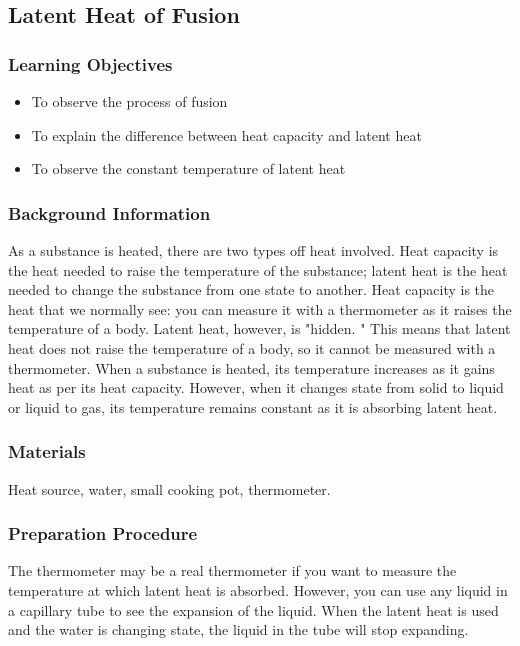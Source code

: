 \subsection{Latent Heat of Fusion} %

\subsubsection*{Learning Objectives}
\begin{itemize}
\item{To observe the process of fusion} 
\item{To explain the difference between heat capacity and latent heat} 
\item{To observe the constant temperature of latent heat} 
\end{itemize}

\subsubsection*{Background Information}
As a substance is heated, there are two types off heat involved. Heat capacity is the heat needed to raise the temperature of the substance; latent heat is the heat needed to change the substance from one state to another.  
Heat capacity is the heat that we normally see: you can measure it with a thermometer as it raises the temperature of a body. Latent heat, however, is "hidden.  " This means that latent heat does not raise the temperature of a body, so it cannot be measured with a thermometer.  
When a substance is heated, its temperature increases as it gains heat as per its heat capacity. However, when it changes state from solid to liquid or liquid to gas, its temperature remains constant as it is absorbing latent heat.  

\subsubsection*{Materials}
Heat source, water, small cooking pot, thermometer.

\subsubsection*{Preparation Procedure}
The thermometer may be a real thermometer if you want to measure the temperature at which latent heat is absorbed. However, you can use any liquid in a capillary tube to see the expansion of the liquid. When the latent heat is used and the water is changing state, the liquid in the tube will stop expanding.

